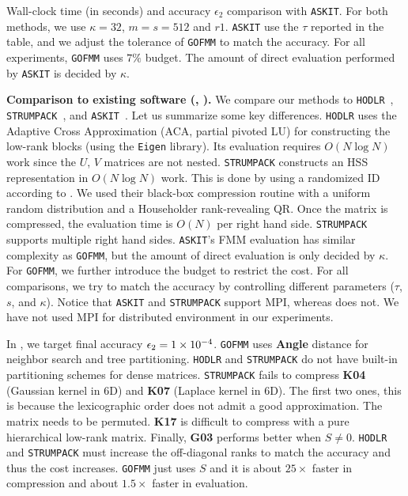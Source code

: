 \begin{table}

\caption{
  Wall-clock time (in seconds) and accuracy $\epsilon_2$ comparison with \texttt{ASKIT}.
  For both methods, we use $\kappa=32$, $m = s = 512$ and $r1$.
  \texttt{ASKIT} use the $\tau$ reported in the table, and we adjust
  the tolerance of \texttt{GOFMM} to match the accuracy.
  For all experiments, \texttt{GOFMM} uses $7\%$ budget.
  The amount of direct evaluation performed by \texttt{ASKIT} is decided
  by $\kappa$.
}
\label{tab:askitcomparison}
\end{table}



\textbf{Comparison to existing software (, ).}
We compare our methods to 
\texttt{HODLR}~\cite{ambikasaran-darve13}, 
\texttt{STRUMPACK}~\cite{rouet-li-e16}, and 
\texttt{ASKIT}~\cite{march-xiao-yu-biros-sisc16}.
Let us summarize some key differences. \texttt{HODLR} uses the
Adaptive Cross Approximation (ACA, partial pivoted LU) for constructing the low-rank blocks (using the \texttt{Eigen} library). Its evaluation requires $O(N\log{N})$ work since the $U$, $V$ matrices are not nested. 
\texttt{STRUMPACK} constructs an HSS representation
in $O(N\log{N})$ work.
This is done by using a randomized ID according to \cite{liberty2007randomized}. 
We used their black-box compression routine with a uniform random distribution 
and a Householder rank-revealing QR.
Once the matrix is compressed, the evaluation time is $O(N)$
per right hand side. \texttt{STRUMPACK} supports multiple right hand sides.
\texttt{ASKIT}'s FMM evaluation has similar complexity as \texttt{GOFMM},
but the amount of direct evaluation is only decided by $\kappa$.
For \texttt{GOFMM}, we further introduce the budget to restrict the
cost. For all comparisons, we try to match the accuracy by controlling
different parameters ($\tau$, $s$, and $\kappa$). Notice
that \texttt{ASKIT} and \texttt{STRUMPACK} support MPI,
whereas \gofmm{} does not. We have not used MPI for distributed 
environment in our experiments.


In , we target final accuracy $\epsilon_2 =
\num{1E-4}$. 
\texttt{GOFMM} uses \textbf{Angle} distance for neighbor search and
tree partitioning. \texttt{HODLR} and \texttt{STRUMPACK} do not have 
built-in partitioning schemes for dense matrices. 
\texttt{STRUMPACK} fails to compress \textbf{K04} (Gaussian kernel in 6D) and
\textbf{K07} (Laplace kernel in 6D). The first two ones, this is because
the lexicographic order does not admit a good \hmatrix{} approximation. The matrix needs to be permuted.
\textbf{K17} is difficult to compress with a pure hierarchical low-rank
matrix. Finally, \textbf{G03} performs better when $S\neq 0$. 
\texttt{HODLR} and \texttt{STRUMPACK} must increase the off-diagonal 
ranks to match the accuracy and thus the cost increases. \texttt{GOFMM} just uses $S$ and it is about
$25\times$ faster in compression and about $1.5\times$ faster in evaluation.

